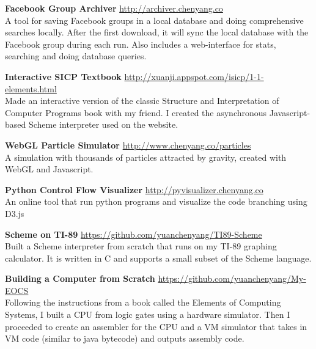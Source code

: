 \documentclass[9pt]{article}
\newenvironment{changemargin}[2]{%
  \begin{list}{}{%
      \setlength{\topsep}{0pt}%
      \setlength{\leftmargin}{#1}%
      \setlength{\rightmargin}{#2}%
      \setlength{\listparindent}{\parindent}%
      \setlength{\itemindent}{\parindent}%
      \setlength{\parsep}{\parskip}%
    }%
  \item[]}{\end{list}
}
\newenvironment{body} {
  \vspace*{-16pt}
  \begin{changemargin}{-0.25in}{-0.5in}
  }
  {\end{changemargin}
}
\begin{document}
\begin{body}
  \vspace{14pt}

  \textbf{Facebook Group Archiver} \hfill \url{http://archiver.chenyang.co}\\
  A tool for saving Facebook groups in a local database and doing comprehensive searches locally. After the first download, it will sync the local database with the Facebook group during each run. Also includes a web-interface for stats, searching and doing database queries. \\
  \medskip

  \textbf{Interactive SICP Textbook} \hfill \url{http://xuanji.appspot.com/isicp/1-1-elements.html}\\
  Made an interactive version of the classic Structure and Interpretation of Computer Programs book with my friend. I created the asynchronous Javascript-based Scheme interpreter used on the website.\\
  \medskip

  \textbf{WebGL Particle Simulator} \hfill \url{http://www.chenyang.co/particles}\\
  A simulation with thousands of particles attracted by gravity, created with  WebGL and Javascript. \\
  \medskip

  \textbf{Python Control Flow Visualizer} \hfill \url{http://pyvisualizer.chenyang.co}\\
  An online tool that run python programs and visualize the code branching using D3.js\\
  \medskip

  \textbf{Scheme on TI-89} \hfill \url{https://github.com/yuanchenyang/TI89-Scheme}\\
  Built a Scheme interpreter from scratch that runs on my TI-89 graphing calculator. It is written in C and supports a small subset of the Scheme language.\\
  \medskip

  \textbf{Building a Computer from Scratch} \hfill \url{https://github.com/yuanchenyang/My-EOCS}\\
  Following the instructions from a book called the Elements of Computing Systems, I built a CPU from logic gates using a hardware simulator. Then I proceeded to create an assembler for the CPU and a VM simulator that takes in VM code (similar to java bytecode) and outputs assembly code. \\
  \medskip


\end{body}
\end{document}
